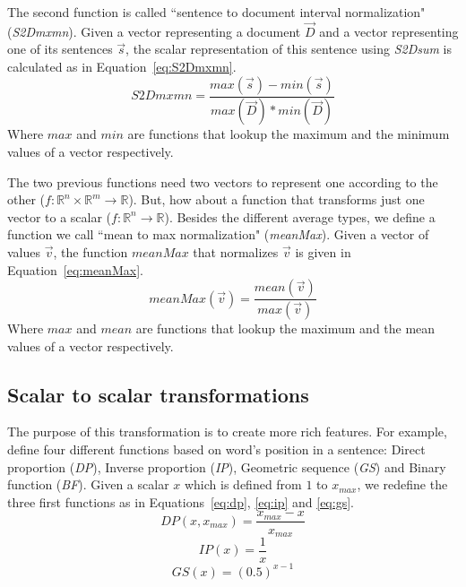 The second function is called ``sentence to document interval normalization" (\textit{S2Dmxmn}). 
Given a vector representing a document $ \overrightarrow{D} $ and a vector representing one of its sentences $ \overrightarrow{s} $, the scalar representation of this sentence using \textit{S2Dsum} is calculated as in Equation~\ref{eq:S2Dmxmn}.
%
\begin{equation}
\label{eq:S2Dmxmn}
S2Dmxmn = \frac{max(\overrightarrow{s}) - min(\overrightarrow{s})}{max(\overrightarrow{D}) * min(\overrightarrow{D})}
\end{equation}
Where $ max $ and $ min $ are functions that lookup the maximum and the minimum values of a vector respectively.


The two previous functions need two vectors to represent one according to the other ($ f: \mathbb{R}^n \times \mathbb{R}^m \rightarrow \mathbb{R} $). 
But, how about a function  that transforms just one vector to a scalar ($ f: \mathbb{R}^n \rightarrow \mathbb{R} $). 
Besides the different average types, we define a function we call ``mean to max normalization" (\textit{meanMax}). 
Given a vector of values $ \overrightarrow{v} $, the function $ meanMax $ that normalizes $ \overrightarrow{v} $ is given in Equation~\ref{eq:meanMax}. 
%
\begin{equation}
\label{eq:meanMax}
meanMax(\overrightarrow{v}) = \frac{mean(\overrightarrow{v})}{max(\overrightarrow{v})}
\end{equation}
Where $ max $ and $ mean $ are functions that lookup the maximum and the mean values of a vector respectively.

\subsection{Scalar to scalar transformations}

The purpose of this transformation is to create more rich features. 
For example, \citet{10-ouyang-al} define four different functions based on word's position in a sentence: Direct proportion (\textit{DP}), Inverse proportion (\textit{IP}), Geometric sequence (\textit{GS}) and Binary function (\textit{BF}). 
Given a scalar $ x $ which is defined from $ 1 $ to $ x_{max} $, we redefine the three first functions as in Equations~\ref{eq:dp}, \ref{eq:ip} and \ref{eq:gs}.
\begin{equation}
\label{eq:dp}
DP(x, x_{max}) = \frac{x_{max} - x}{x_{max}}
\end{equation}
\begin{equation}
\label{eq:ip}
IP(x) = \frac{1}{x}
\end{equation}
\begin{equation}
\label{eq:gs}
GS(x) = (0.5)^{x - 1}
\end{equation}

